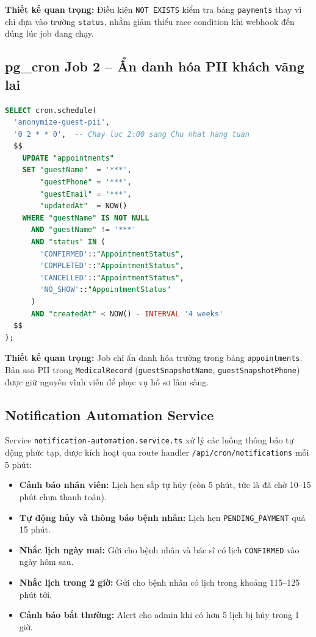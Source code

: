 \documentclass[14pt,a4paper]{report}
\begin{document}
\textbf{Thiết kế quan trọng:} Điều kiện \texttt{NOT EXISTS} kiểm tra
bảng \texttt{payments} thay vì chỉ dựa vào trường \texttt{status},
nhằm giảm thiểu race condition khi webhook đến đúng lúc job đang chạy.

\subsection{pg\_cron Job 2 -- Ẩn danh hóa PII khách vãng lai}

\begin{lstlisting}[language=SQL, caption={pg\_cron: Ẩn danh hóa PII khách vãng lai sau 4 tuần}]
SELECT cron.schedule(
  'anonymize-guest-pii',
  '0 2 * * 0',  -- Chay luc 2:00 sang Chu nhat hang tuan
  $$
    UPDATE "appointments"
    SET "guestName"  = '***',
        "guestPhone" = '***',
        "guestEmail" = '***',
        "updatedAt"  = NOW()
    WHERE "guestName" IS NOT NULL
      AND "guestName" != '***'
      AND "status" IN (
        'CONFIRMED'::"AppointmentStatus",
        'COMPLETED'::"AppointmentStatus",
        'CANCELLED'::"AppointmentStatus",
        'NO_SHOW'::"AppointmentStatus"
      )
      AND "createdAt" < NOW() - INTERVAL '4 weeks'
  $$
);
\end{lstlisting}

\textbf{Thiết kế quan trọng:} Job chỉ ẩn danh hóa trường trong bảng
\texttt{appointments}. Bản sao PII trong \texttt{MedicalRecord}
(\texttt{guestSnapshotName}, \texttt{guestSnapshotPhone}) được giữ
nguyên vĩnh viễn để phục vụ hồ sơ lâm sàng.

\subsection{Notification Automation Service}

Service \texttt{notification-automation.service.ts} xử lý các luồng
thông báo tự động phức tạp, được kích hoạt qua route handler
\texttt{/api/cron/notifications} mỗi 5 phút:

\begin{itemize}
    \item \textbf{Cảnh báo nhân viên:} Lịch hẹn sắp tự hủy (còn 5 phút,
          tức là đã chờ 10--15 phút chưa thanh toán).
    \item \textbf{Tự động hủy và thông báo bệnh nhân:} Lịch hẹn
          \texttt{PENDING\_PAYMENT} quá 15 phút.
    \item \textbf{Nhắc lịch ngày mai:} Gửi cho bệnh nhân và bác sĩ
          có lịch \texttt{CONFIRMED} vào ngày hôm sau.
    \item \textbf{Nhắc lịch trong 2 giờ:} Gửi cho bệnh nhân có lịch
          trong khoảng 115--125 phút tới.
    \item \textbf{Cảnh báo bất thường:} Alert cho admin khi có hơn 5
          lịch bị hủy trong 1 giờ.
\end{itemize}
\end{document}
